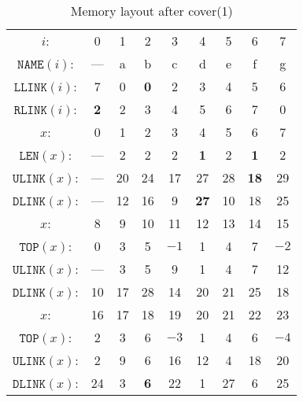 \documentclass[a4paper,landscape,11pt]{article}
\begin{document}
\begin{table}
	\begin{center}
		\caption{Memory layout after cover(1)}
		\begin{tabular}{c c c c c c c c c }
			\hline
			$i$:                 & 0          & 1  & 2          & 3          & 4           & 5  & 6           & 7    \\
			$\texttt{NAME}(i)$:  & ---        & a  & b          & c          & d           & e  & f           & g    \\
			$\texttt{LLINK}(i)$: & 7          & 0  & \textbf{0} & 2          & 3           & 4  & 5           & 6    \\
			$\texttt{RLINK}(i)$: & \textbf{2} & 2  & 3          & 4          & 5           & 6  & 7           & 0    \\
			\hline
			$x$:                 & 0          & 1  & 2          & 3          & 4           & 5  & 6           & 7    \\
			$\texttt{LEN}(x)$:   & ---        & 2  & 2          & 2          & \textbf{1}  & 2  & \textbf{1}  & 2    \\
			$\texttt{ULINK}(x)$: & ---        & 20 & 24         & 17         & 27          & 28 & \textbf{18} & 29   \\
			$\texttt{DLINK}(x)$: & ---        & 12 & 16         & 9          & \textbf{27} & 10 & 18          & 25   \\
			\hline
			$x$:                 & 8          & 9  & 10         & 11         & 12          & 13 & 14          & 15   \\
			$\texttt{TOP}(x)$:   & 0          & 3  & 5          & $-1$       & 1           & 4  & 7           & $-2$ \\
			$\texttt{ULINK}(x)$: & ---        & 3  & 5          & 9          & 1           & 4  & 7           & 12   \\
			$\texttt{DLINK}(x)$: & 10         & 17 & 28         & 14         & 20          & 21 & 25          & 18   \\
			\hline
			$x$:                 & 16         & 17 & 18         & 19         & 20          & 21 & 22          & 23   \\
			$\texttt{TOP}(x)$:   & 2          & 3  & 6          & $-3$       & 1           & 4  & 6           & $-4$ \\
			$\texttt{ULINK}(x)$: & 2          & 9  & 6          & 16         & 12          & 4  & 18          & 20   \\
			$\texttt{DLINK}(x)$: & 24         & 3  & \textbf{6} & 22         & 1           & 27 & 6           & 25   \\

\end{tabular}
\end{center}
\end{table}
\end{document}
